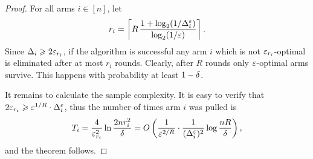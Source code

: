 \begin{proof}
For all arms $i \in [n]$, let
\begin{align*}
	r_i = \left\lceil
		R \, \frac{1+\log_2 (1/\Delta^{\varepsilon}_i)}{\log_2 (1/\varepsilon)}
	\right\rceil .
\end{align*}
Since $\Delta_i \geqslant 2\varepsilon_{r_i}$, if the algorithm is successful any arm $i$ which is not $\varepsilon_{r_i}$-optimal is eliminated after at most $r_i$ rounds.
Clearly, after $R$ rounds only $\varepsilon$-optimal arms survive.
This happens with probability at least $1-\delta$.

It remains to calculate the sample complexity. 
It is easy to verify that $2\varepsilon_{r_i} \geqslant \varepsilon^{1/R} \cdot \Delta^{\varepsilon}_i$, thus the number of times arm $i$ was pulled is
\begin{align*}
	T_i 
	= \frac{4}{\varepsilon_{r_i}^2} \ln \frac{2n r_i^2}{\delta}
	= O\left(
		\frac{1}{\varepsilon^{2/R}} \cdot \frac{1}{(\Delta^{\varepsilon}_i)^2} \log \frac{n R}{\delta}
	\right) ,
\end{align*}
and the theorem follows.
\end{proof}

